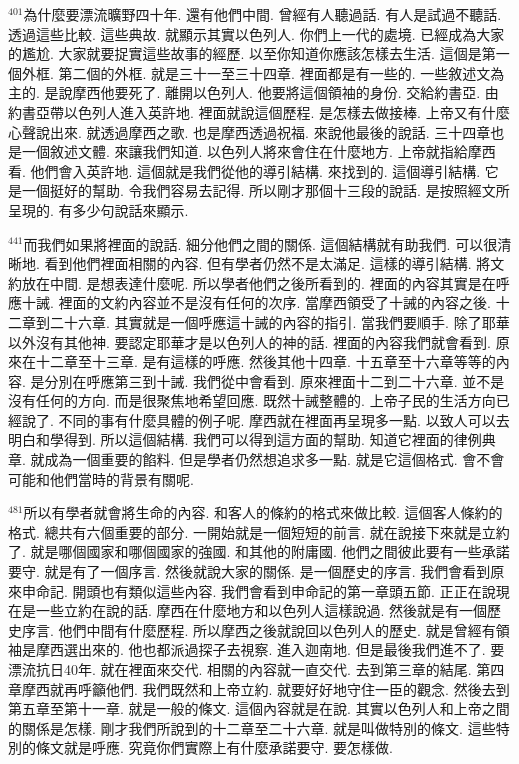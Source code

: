 \documentclass{book}
\begin{document}
$^{401}$為什麼要漂流曠野四十年.
還有他們中間.
曾經有人聽過話.
有人是試過不聽話.
透過這些比較.
這些典故.
就顯示其實以色列人.
你們上一代的處境.
已經成為大家的尷尬.
大家就要捉實這些故事的經歷.
以至你知道你應該怎樣去生活.
這個是第一個外框.
第二個的外框.
就是三十一至三十四章.
裡面都是有一些的.
一些敘述文為主的.
是說摩西他要死了.
離開以色列人.
他要將這個領袖的身份.
交給約書亞.
由約書亞帶以色列人進入英許地.
裡面就說這個歷程.
是怎樣去做接棒.
上帝又有什麼心聲說出來.
就透過摩西之歌.
也是摩西透過祝福.
來說他最後的說話.
三十四章也是一個敘述文體.
來讓我們知道.
以色列人將來會住在什麼地方.
上帝就指給摩西看.
他們會入英許地.
這個就是我們從他的導引結構.
來找到的.
這個導引結構.
它是一個挺好的幫助.
令我們容易去記得.
所以剛才那個十三段的說話.
是按照經文所呈現的.
有多少句說話來顯示.

$^{441}$而我們如果將裡面的說話.
細分他們之間的關係.
這個結構就有助我們.
可以很清晰地.
看到他們裡面相關的內容.
但有學者仍然不是太滿足.
這樣的導引結構.
將文約放在中間.
是想表達什麼呢.
所以學者他們之後所看到的.
裡面的內容其實是在呼應十誡.
裡面的文約內容並不是沒有任何的次序.
當摩西領受了十誡的內容之後.
十二章到二十六章.
其實就是一個呼應這十誡的內容的指引.
當我們要順手.
除了耶華以外沒有其他神.
要認定耶華才是以色列人的神的話.
裡面的內容我們就會看到.
原來在十二章至十三章.
是有這樣的呼應.
然後其他十四章.
十五章至十六章等等的內容.
是分別在呼應第三到十誡.
我們從中會看到.
原來裡面十二到二十六章.
並不是沒有任何的方向.
而是很聚焦地希望回應.
既然十誡整體的.
上帝子民的生活方向已經說了.
不同的事有什麼具體的例子呢.
摩西就在裡面再呈現多一點.
以致人可以去明白和學得到.
所以這個結構.
我們可以得到這方面的幫助.
知道它裡面的律例典章.
就成為一個重要的餡料.
但是學者仍然想追求多一點.
就是它這個格式.
會不會可能和他們當時的背景有關呢.

$^{481}$所以有學者就會將生命的內容.
和客人的條約的格式來做比較.
這個客人條約的格式.
總共有六個重要的部分.
一開始就是一個短短的前言.
就在說接下來就是立約了.
就是哪個國家和哪個國家的強國.
和其他的附庸國.
他們之間彼此要有一些承諾要守.
就是有了一個序言.
然後就說大家的關係.
是一個歷史的序言.
我們會看到原來申命記.
開頭也有類似這些內容.
我們會看到申命記的第一章頭五節.
正正在說現在是一些立約在說的話.
摩西在什麼地方和以色列人這樣說過.
然後就是有一個歷史序言.
他們中間有什麼歷程.
所以摩西之後就說回以色列人的歷史.
就是曾經有領袖是摩西選出來的.
他也都派過探子去視察.
進入迦南地.
但是最後我們進不了.
要漂流抗日40年.
就在裡面來交代.
相關的內容就一直交代.
去到第三章的結尾.
第四章摩西就再呼籲他們.
我們既然和上帝立約.
就要好好地守住一臣的觀念.
然後去到第五章至第十一章.
就是一般的條文.
這個內容就是在說.
其實以色列人和上帝之間的關係是怎樣.
剛才我們所說到的十二章至二十六章.
就是叫做特別的條文.
這些特別的條文就是呼應.
究竟你們實際上有什麼承諾要守.
要怎樣做.
\end{document}
